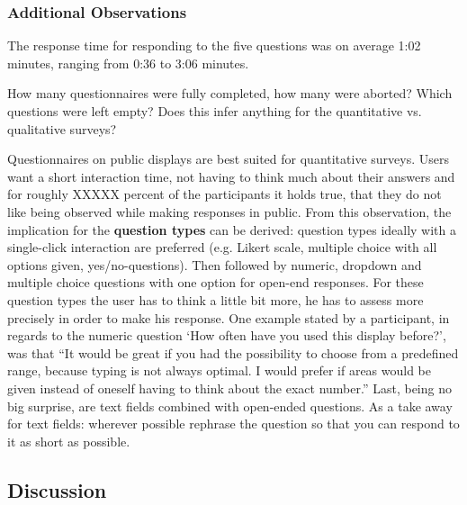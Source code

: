 	\subsubsection{Additional Observations}

	The response time for responding to the five questions was on average 1:02 minutes, ranging from 0:36 to 3:06 minutes.

	How many questionnaires were fully completed, how many were aborted? Which questions were left empty? Does this infer anything for the quantitative vs. qualitative surveys?

	
	Questionnaires on public displays are best suited for quantitative surveys. Users want a short interaction time, not having to think much about their answers and for roughly XXXXX percent of the participants it holds true, that they do not like being observed while making responses in public.
	From this observation, the implication for the \textbf{question types} can be derived: question types ideally with a single-click interaction are preferred (e.g. Likert scale, multiple choice with all options given, yes/no-questions). Then followed by numeric, dropdown and multiple choice questions with one option for open-end responses. For these question types the user has to think a little bit more, he has to assess more precisely in order to make his response. One example stated by a participant, in regards to the numeric question `How often have you used this display before?', was that ``It would be great if you had the possibility to choose from a predefined range, because typing is not always optimal. I would prefer if areas would be given instead of oneself having to think about the exact number.'' Last, being no big surprise, are text fields combined with open-ended questions. As a take away for text fields: wherever possible rephrase the question so that you can respond to it as short as possible.




\clearpage
\subsection{Discussion}







